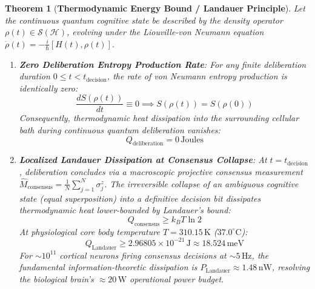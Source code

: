 \documentclass[10pt,twocolumn,3p]{article}
\newtheorem{theorem}{Theorem}
\begin{document}
\begin{theorem}[\textbf{Thermodynamic Energy Bound / Landauer Principle}]
\label{thm:thermodynamics}
\label{thm:landauer_bound}
Let the continuous quantum cognitive state be described by the density operator $\rho(t) \in \mathcal{S}(\mathcal{H})$, evolving under the Liouville-von Neumann equation $\dot{\rho}(t) = -\frac{i}{\hbar}[H(t), \rho(t)]$.

\begin{enumerate}
    \item \textbf{Zero Deliberation Entropy Production Rate}:
    For any finite deliberation duration $0 \le t < t_{\text{decision}}$, the rate of von Neumann entropy production is identically zero:
    \begin{equation}
        \frac{d S(\rho(t))}{dt} \equiv 0 \implies S(\rho(t)) = S(\rho(0))
        \label{eq:dS_zero}
    \end{equation}
    Consequently, thermodynamic heat dissipation into the surrounding cellular bath during continuous quantum deliberation vanishes:
    \begin{equation}
        Q_{\text{deliberation}} = 0\,\text{Joules}
    \end{equation}
    
    \item \textbf{Localized Landauer Dissipation at Consensus Collapse}:
    At $t = t_{\text{decision}}$, deliberation concludes via a macroscopic projective consensus measurement $\hat{M}_{\text{consensus}} = \frac{1}{N} \sum_{j=1}^N \sigma_j^z$. The irreversible collapse of an ambiguous cognitive state (equal superposition) into a definitive decision bit dissipates thermodynamic heat lower-bounded by Landauer's bound:
    \begin{equation}
        \boxed{Q_{\text{consensus}} \ge k_B T \ln 2}
        \label{eq:landauer_bound}
    \end{equation}
    At physiological core body temperature $T = 310.15\,\text{K}$ ($37.0^\circ\text{C}$):
    \begin{equation}
        Q_{\text{Landauer}} \ge 2.96805 \times 10^{-21}\,\text{J} \approx 18.524\,\text{meV}
    \end{equation}
    For $\sim 10^{11}$ cortical neurons firing consensus decisions at $\sim 5\,\text{Hz}$, the fundamental information-theoretic dissipation is $P_{\text{Landauer}} \approx 1.48\,\text{nW}$, resolving the biological brain's $\approx 20\,\text{W}$ operational power budget.
\end{enumerate}
\end{theorem}
\end{document}
